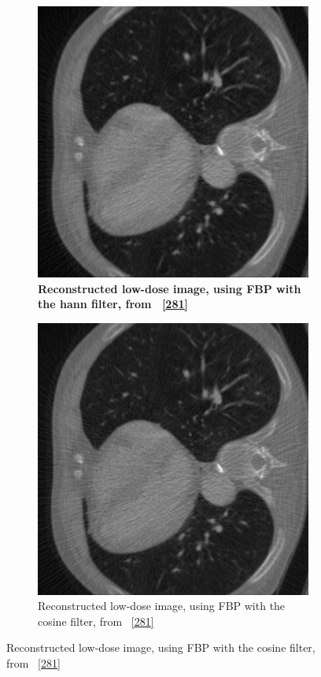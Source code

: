 \documentclass[12pt,a4paper]{article}
\begin{document}
\begin{figure}[h!]
\begin{subfigure}[t]{\size\textwidth}
        \includegraphics[width=\textwidth]{Bachelorthesis//UsedImages/hann_50.png}
        \caption{\textbf{Reconstructed low-dose image, using FBP with the hann filter, from ~\ref{281}}}
        \label{fig:windowII+l2+slow50_hann}
    \end{subfigure}
    \hfill
    \begin{subfigure}[t]{\size\textwidth}
        \centering
        \includegraphics[width=\textwidth]{Bachelorthesis//UsedImages/cosine_50.png}
        \caption{Reconstructed low-dose image, using FBP with the cosine filter, from ~\ref{281}}
        \label{fig:windowII+l2+slow50_cosine}
    \end{subfigure}
        

\end{figure}
\end{document}
